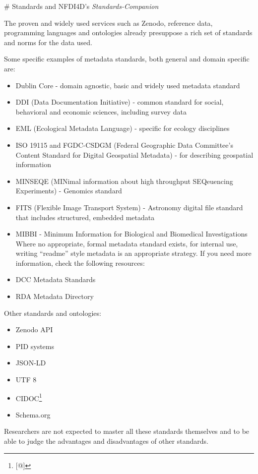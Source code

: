 \documentclass[
  english,
  paper=a4,
  oneside,captions=tableheading
]{scrbook}
\providecommand{\tightlist}{%
  \setlength{\itemsep}{0pt}\setlength{\parskip}{0pt}}
\begin{document}
\# Standards and NFDI4D's \emph{Standards-Companion}

The proven and widely used services such as Zenodo, reference data,
programming languages and ontologies already presuppose a rich set of
standards and norms for the data used.

Some specific examples of metadata standards, both general and domain
specific are:

\begin{itemize}
\tightlist
\item
  Dublin Core - domain agnostic, basic and widely used metadata standard
\item
  DDI (Data Documentation Initiative) - common standard for social,
  behavioral and economic sciences, including survey data
\item
  EML (Ecological Metadata Language) - specific for ecology disciplines
\item
  ISO 19115 and FGDC-CSDGM (Federal Geographic Data Committee's Content
  Standard for Digital Geospatial Metadata) - for describing geospatial
  information
\item
  MINSEQE (MINimal information about high throughput SEQeuencing
  Experiments) - Genomics standard
\item
  FITS (Flexible Image Transport System) - Astronomy digital file
  standard that includes structured, embedded metadata
\item
  MIBBI - Minimum Information for Biological and Biomedical
  Investigations Where no appropriate, formal metadata standard exists,
  for internal use, writing ``readme'' style metadata is an appropriate
  strategy. If you need more information, check the following resources:
\item
  DCC Metadata Standards
\item
  RDA Metadata Directory
\end{itemize}

Other standards and ontologies:

\begin{itemize}
\tightlist
\item
  Zenodo API
\item
  PID systems
\item
  JSON-LD
\item
  UTF 8
\item
  CIDOC\footnote{{[}@{]}}
\item
  Schema.org
\end{itemize}

Researchers are not expected to master all these standards themselves
and to be able to judge the advantages and disadvantages of other
standards.
\end{document}
